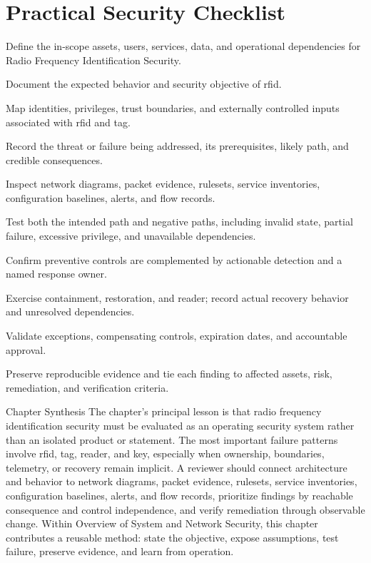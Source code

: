\documentclass[11pt,letterpaper]{article}
\begin{document}
\section*{Practical Security Checklist}
\begin{CornellChecklist}
\item Define the in-scope assets, users, services, data, and operational dependencies for Radio Frequency Identification Security.
\item Document the expected behavior and security objective of rfid.
\item Map identities, privileges, trust boundaries, and externally controlled inputs associated with rfid and tag.
\item Record the threat or failure being addressed, its prerequisites, likely path, and credible consequences.
\item Inspect network diagrams, packet evidence, rulesets, service inventories, configuration baselines, alerts, and flow records.
\item Test both the intended path and negative paths, including invalid state, partial failure, excessive privilege, and unavailable dependencies.
\item Confirm preventive controls are complemented by actionable detection and a named response owner.
\item Exercise containment, restoration, and reader; record actual recovery behavior and unresolved dependencies.
\item Validate exceptions, compensating controls, expiration dates, and accountable approval.
\item Preserve reproducible evidence and tie each finding to affected assets, risk, remediation, and verification criteria.
\end{CornellChecklist}
\begin{CornellSummaryBox}{Chapter Synthesis}
The chapter's principal lesson is that radio frequency identification security must be evaluated as an operating security system rather than an isolated product or statement. The most important failure patterns involve rfid, tag, reader, and key, especially when ownership, boundaries, telemetry, or recovery remain implicit. A reviewer should connect architecture and behavior to network diagrams, packet evidence, rulesets, service inventories, configuration baselines, alerts, and flow records, prioritize findings by reachable consequence and control independence, and verify remediation through observable change. Within Overview of System and Network Security, this chapter contributes a reusable method: state the objective, expose assumptions, test failure, preserve evidence, and learn from operation.
\end{CornellSummaryBox}
\end{document}
